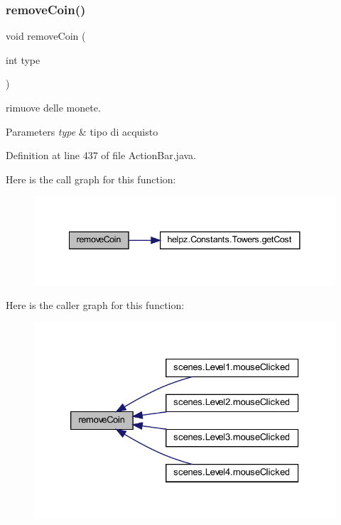 \subsubsection{\texorpdfstring{remove\+Coin()}{removeCoin()}}
{\footnotesize\ttfamily void remove\+Coin (\begin{DoxyParamCaption}\item[{int}]{type }\end{DoxyParamCaption})}



rimuove delle monete. 


\begin{DoxyParams}{Parameters}
{\em type} & tipo di acquisto \\
\hline
\end{DoxyParams}


Definition at line 437 of file Action\+Bar.\+java.

Here is the call graph for this function\+:\nopagebreak
\begin{figure}[H]
\begin{center}
\leavevmode
\includegraphics[width=341pt]{classui_1_1_action_bar_a99a8282ac7383f267261ca608cafe139_cgraph}
\end{center}
\end{figure}
Here is the caller graph for this function\+:\nopagebreak
\begin{figure}[H]
\begin{center}
\leavevmode
\includegraphics[width=326pt]{classui_1_1_action_bar_a99a8282ac7383f267261ca608cafe139_icgraph}
\end{center}
\end{figure}
\mbox{\label{classui_1_1_action_bar_a484775c889ccd8602b66ad795b141534}} 
